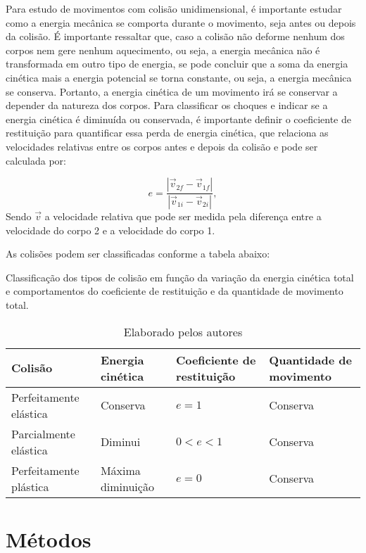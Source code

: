 \documentclass[12pt, twoside]{article}
\begin{document}
Para estudo de movimentos com colisão unidimensional, é importante estudar como a energia mecânica se comporta durante o movimento, seja antes ou depois da colisão. É importante ressaltar que, caso a colisão não deforme nenhum dos corpos nem gere nenhum aquecimento, ou seja, a energia mecânica não é transformada em outro tipo de energia, se pode concluir que a soma da energia cinética mais a energia potencial se torna constante, ou seja, a energia mecânica se conserva. Portanto, a energia cinética de um movimento irá se conservar a depender da natureza dos corpos. Para classificar os choques e indicar se a energia cinética é diminuída ou conservada, é importante definir o coeficiente de restituição para quantificar essa perda de energia cinética, que relaciona as velocidades relativas entre os corpos antes e depois da colisão e pode ser calculada por:

\begin{equation}
\label{eq:Coeficiente_de_restituicao_elastica}
e = \frac{|\vec{v}_{2f} - \vec{v}_{1f}|}{|\vec{v}_{1i} - \vec{v}_{2i}|},
\end{equation}
Sendo $\vec{v}$ a velocidade relativa que pode ser medida pela diferença entre a velocidade do corpo 2 e a velocidade do corpo 1. 

As colisões podem ser classificadas conforme a tabela abaixo:


\begin{table}[h!]
\centering
\caption{Classificação dos tipos de colisão em função da variação da energia cinética total e comportamentos do coeficiente de restituição e da quantidade de movimento total.}
\begin{tabular}{|m{4cm}|m{4cm}|m{4cm}|m{4cm}|}
\hline
\textbf{Colisão} & \textbf{Energia cinética} & \textbf{Coeficiente de restituição} & \textbf{Quantidade de movimento} \\ 
\hline
Perfeitamente elástica & Conserva & \(e = 1\) & Conserva \\ 
\hline
Parcialmente elástica & Diminui & \(0 < e < 1\) & Conserva \\ 
\hline
Perfeitamente plástica & Máxima diminuição & \(e = 0\) & Conserva \\ 
\hline
\end{tabular}
\caption*{Elaborado pelos autores}
\label{table:colisao}
\end{table}








\section{Métodos}
\end{document}

